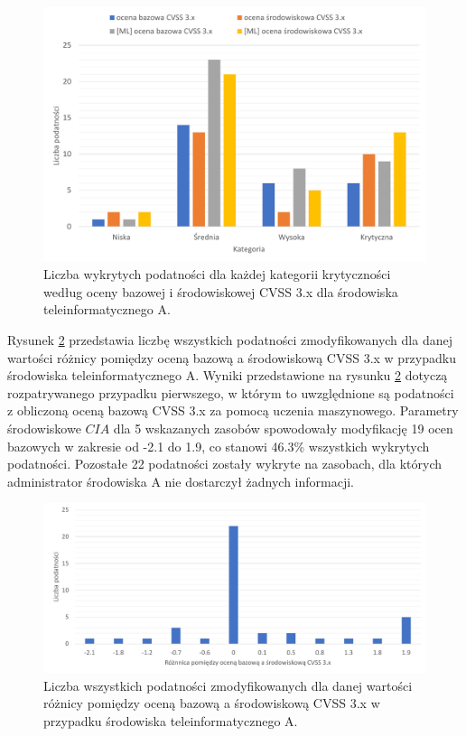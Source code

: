 \begin{figure}[!ht]
\centering
\includegraphics[width=.9\textwidth]{Chapters/Eksperymenty/env_A_results/cvss_3_ml.pdf}
\caption{Liczba wykrytych podatności dla każdej kategorii krytyczności według oceny bazowej i środowiskowej CVSS 3.x dla środowiska teleinformatycznego A.}
\label{fig:chapter6:env_a:cvss_3}
\end{figure}


\bigbreak
Rysunek \ref{fig:chapter6:env_a:cvss_3_changes_ml} przedstawia liczbę wszystkich podatności zmodyfikowanych dla danej wartości różnicy pomiędzy oceną bazową a środowiskową CVSS 3.x w przypadku środowiska teleinformatycznego A. Wyniki przedstawione na rysunku \ref{fig:chapter6:env_a:cvss_3_changes_ml} dotyczą rozpatrywanego przypadku pierwszego, w którym to uwzględnione są podatności z obliczoną oceną bazową CVSS 3.x za pomocą uczenia maszynowego. Parametry środowiskowe $CIA$ dla 5 wskazanych zasobów spowodowały modyfikację 19 ocen bazowych w zakresie od -2.1 do 1.9, co stanowi 46.3\% wszystkich wykrytych podatności. Pozostałe 22 podatności zostały wykryte na zasobach, dla których administrator środowiska A nie dostarczył żadnych informacji. 

\begin{figure}[!ht]
\centering
\includegraphics[width=.9\textwidth]{Chapters/Eksperymenty/env_A_results/changes_cvss_3_ml.pdf}
\caption{Liczba wszystkich podatności zmodyfikowanych dla danej wartości różnicy pomiędzy oceną bazową a środowiskową CVSS 3.x w przypadku środowiska teleinformatycznego A.}
\label{fig:chapter6:env_a:cvss_3_changes_ml}
\end{figure}

